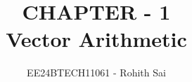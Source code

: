 \documentclass[journal]{IEEEtran}
\begin{document}

\vspace{3cm}

\title{CHAPTER - 1\\Vector Arithmetic}
\author{EE24BTECH11061 - Rohith Sai}
{\let\newpage\relax\maketitle}

\renewcommand{\thefigure}{\theenumi}
\renewcommand{\thetable}{\theenumi}
\setlength{\intextsep}{10pt} %

\renewcommand{\thetable}{\theenumi}
\end{document}
